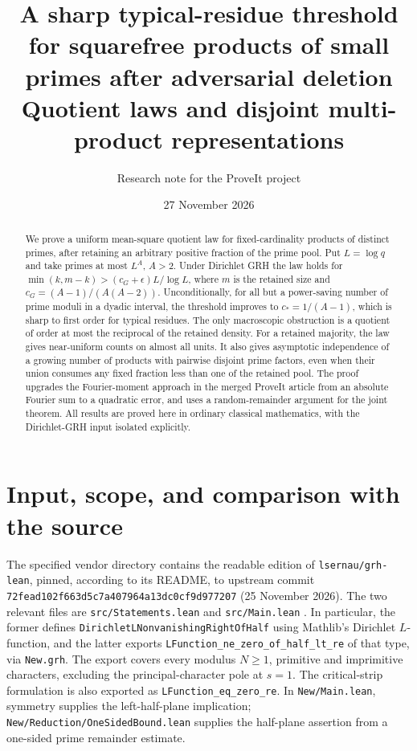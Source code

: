 \documentclass[11pt]{article}
\title{A sharp typical-residue threshold for squarefree products of small primes after adversarial deletion\\[4pt]\large Quotient laws and disjoint multi-product representations}
\author{Research note for the ProveIt project}
\date{27 November 2026}
\theoremstyle{remark}\newtheorem{remark}[theorem]{Remark}
\begin{document}
\maketitle
\begin{abstract}
We prove a uniform mean-square quotient law for fixed-cardinality products of distinct primes, after retaining an arbitrary positive fraction of the prime pool. Put $L=\log q$ and take primes at most $L^A$, $A>2$. Under Dirichlet GRH the law holds for $\min(k,m-k)>(c_G+\epsilon)L/\log L$, where $m$ is the retained size and $c_G=(A-1)/(A(A-2))$. Unconditionally, for all but a power-saving number of prime moduli in a dyadic interval, the threshold improves to $c_*=1/(A-1)$, which is sharp to first order for typical residues. The only macroscopic obstruction is a quotient of order at most the reciprocal of the retained density. For a retained majority, the law gives near-uniform counts on almost all units. It also gives asymptotic independence of a growing number of products with pairwise disjoint prime factors, even when their union consumes any fixed fraction less than one of the retained pool. The proof upgrades the Fourier-moment approach in the merged ProveIt article from an absolute Fourier sum to a quadratic error, and uses a random-remainder argument for the joint theorem. All results are proved here in ordinary classical mathematics, with the Dirichlet-GRH input isolated explicitly.
\end{abstract}
\section{Input, scope, and comparison with the source}
The specified vendor directory contains the readable edition of \texttt{lsernau/grh-lean}, pinned, according to its README, to upstream commit \texttt{72fead102f663d5c7a407964a13dc0cf9d977207} (25 November 2026). The two relevant files are \texttt{src/Statements.lean} and \texttt{src/Main.lean} \cite{vendor}. In particular, the former defines \texttt{DirichletLNonvanishingRightOfHalf} using Mathlib's Dirichlet $L$-function, and the latter exports \texttt{LFunction\_ne\_zero\_of\_half\_lt\_re} of that type, via \texttt{New.grh}. The export covers every modulus $N\ge1$, primitive and imprimitive characters, excluding the principal-character pole at $s=1$. The critical-strip formulation is also exported as \texttt{LFunction\_eq\_zero\_re}. In \texttt{New/Main.lean}, symmetry supplies the left-half-plane implication; \texttt{New/Reduction/OneSidedBound.lean} supplies the half-plane assertion from a one-sided prime remainder estimate.
\end{document}
